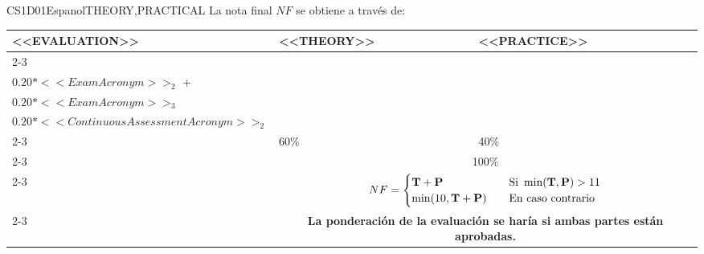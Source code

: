   \begin{evaluation}{CS1D01}{Espanol}{THEORY,PRACTICAL}
  La nota final $NF$ se obtiene a través de:

  \begin{tabularx}{0.9\textwidth}{|X|p{}|p{}|} \hline
  \multirow{4}{*}{\uppercase{<<Evaluation>>}} & \uppercase{<<Theory>>} & \uppercase{<<Practice>>} \\ \cline{2-3}
  & %
      \begin{minipage}{0.95\textwidth}
      \begin{tabular}{l}
          $\text{\textbf{T}} = 0.20*<<ExamAcronym>>_{1}$  + \\
          $0.20*<<ExamAcronym>>_{2}$  + \\
          $0.20*<<ExamAcronym>>_{3}$  
          \end{tabular}
      \end{minipage}
  & %
      \begin{minipage}{0.95\textwidth}
      \begin{tabular}{l}
          $\text{\textbf{P}} = 0.20*<<ContinuousAssessmentAcronym>>_{1}$ + \\
          $0.20*<<ContinuousAssessmentAcronym>>_{2}$ 
      \end{tabular}
      \end{minipage}                 \\ \cline{2-3}

  & %
  60\% 
  & %
  40\% \\ \cline{2-3}
  & \multicolumn{2}{c|}{100\%}  \\ \cline{2-3}
  & \multicolumn{2}{c|}{
    \begin{math}
      NF =
      \begin{cases}
        \text{\textbf{T}} + \text{\textbf{P}}   & \quad \text{Si } \min(\text{\textbf{T}},\text{\textbf{P}}) > 11   \\
        \min(10,\text{\textbf{T}} + \text{\textbf{P}})    & \quad \text{En caso contrario}
      \end{cases}
    \end{math}
  } \\ \cline{2-3}
  & \multicolumn{2}{c|}{\textbf{La ponderación de la evaluación se haría si ambas partes están aprobadas.}}  \\ \hline
  \end{tabularx}


\end{evaluation}
